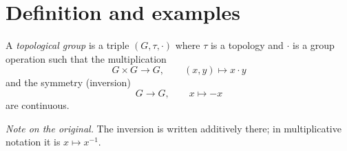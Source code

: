 \section{Definition and examples}
\label{section-definition-examples}

\begin{definition}
\label{definition-topological-group}
A {\it topological group} is a triple
$(G,\tau,\cdot)$ where $\tau$ is a
topology and $\cdot$ is a group
operation such that the multiplication
$$
G\times G\to G,
\qquad
(x,y)\mapsto x\cdot y
$$
and the symmetry (inversion)
$$
G\to G,
\qquad
x\mapsto -x
$$
are continuous.
\end{definition}

\noindent
{\it Note on the original.} The inversion
is written additively there; in
multiplicative notation it is
$x\mapsto x^{-1}$.

